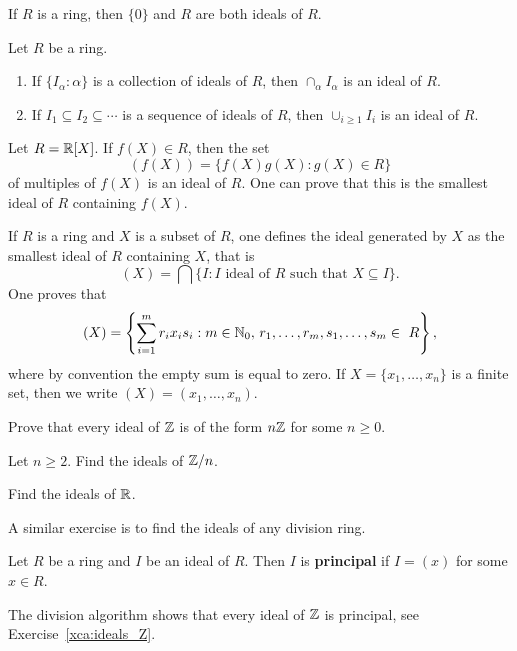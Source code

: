 If $R$ is a ring, then $\{0\}$ and $R$ are both ideals of $R$. 

\begin{exercise}
Let $R$ be a ring. 
\begin{enumerate}
\item If $\{I_\alpha:\alpha\}$ is a collection of ideals of $R$, then $\cap_{\alpha}I_\alpha$ is an ideal of $R$.  	
\item If $I_1\subseteq I_2\subseteq\cdots$ is a sequence of ideals of $R$, then $\cup_{i\geq1}I_i$ is an ideal of $R$. 
\end{enumerate}
\end{exercise}

\begin{example}
Let $R=\mathbb{R}[X]$. If $f(X)\in R$, then the set 
\[
(f(X))=\{f(X)g(X):g(X)\in R\}
\]
of multiples of $f(X)$ is an ideal of $R$. One can prove that this is the smallest 
ideal of $R$ containing $f(X)$.  	
\end{example}

If $R$ is a ring and $X$ is a subset of $R$, one defines
the ideal generated by $X$ as the smallest ideal of $R$ containing $X$, that is 
\[
(X)=\bigcap\{I:\text{$I$ ideal of $R$ such that $X\subseteq I$}\}.
\]
One proves that 
\[
(X)=\left\{\sum_{i=1}^mr_ix_is_i:m\in\N_0,\,r_1,\dots,r_m,s_1,\dots,s_m\in R\right\}, 
\]
where by convention the empty sum is equal to zero. If $X=\{x_1,\dots,x_n\}$ is a finite
set, then we write $(X)=(x_1,\dots,x_n)$. 

\begin{exercise}
\label{xca:ideals_Z}
Prove that every ideal of $\mathbb{Z}$ is of the form $n\mathbb{Z}$ for some $n\geq0$. 	
\end{exercise}

\begin{exercise}
Let $n\geq2$. Find the ideals of $\mathbb{Z}/n$. 	
\end{exercise}

\begin{exercise}
Find the ideals of $\mathbb{R}$.	
\end{exercise}

A similar exercise is to find the ideals of any division ring.  

\begin{definition}
Let $R$ be a ring and $I$ be an ideal of $R$. Then $I$ is \textbf{principal}
if $I=(x)$ for some $x\in R$. 	
\end{definition}

The division algorithm shows that every ideal of $\mathbb{Z}$ is principal, 
see Exercise~\ref{xca:ideals_Z}.  

